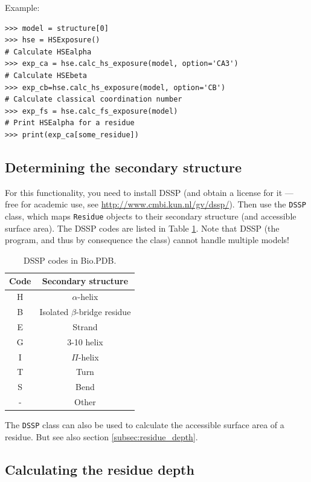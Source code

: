 \documentclass{report}
\begin{document}
Example:

\begin{verbatim}
>>> model = structure[0]
>>> hse = HSExposure()
# Calculate HSEalpha
>>> exp_ca = hse.calc_hs_exposure(model, option='CA3')
# Calculate HSEbeta
>>> exp_cb=hse.calc_hs_exposure(model, option='CB')
# Calculate classical coordination number
>>> exp_fs = hse.calc_fs_exposure(model)
# Print HSEalpha for a residue
>>> print(exp_ca[some_residue])
\end{verbatim}

\subsection{Determining the secondary structure}

For this functionality, you need to install DSSP (and obtain a license
for it --- free for academic use, see \url{http://www.cmbi.kun.nl/gv/dssp/}).
Then use the \texttt{DSSP} class, which maps \texttt{Residue} objects
to their secondary structure (and accessible surface area). The DSSP
codes are listed in Table \ref{cap:DSSP-codes}. Note that DSSP (the
program, and thus by consequence the class) cannot handle multiple
models!

\begin{table}
\begin{tabular}{|c|c|}
\hline 
Code&
Secondary structure \\
\hline
\hline 
H&
$\alpha$-helix \\
\hline 
B&
Isolated $\beta$-bridge residue \\
\hline 
E&
Strand \\
\hline 
G&
3-10 helix \\
\hline 
I&
$\Pi$-helix \\
\hline 
T&
Turn\\
\hline 
S&
Bend \\
\hline 
-&
Other\\
\hline
\end{tabular}
\caption{\label{cap:DSSP-codes}DSSP codes in Bio.PDB.}
\end{table}

The \texttt{DSSP} class can also be used to calculate the accessible surface area of a residue. But see also section \ref{subsec:residue_depth}.

\subsection{Calculating the residue depth\label{subsec:residue_depth}}
\end{document}
